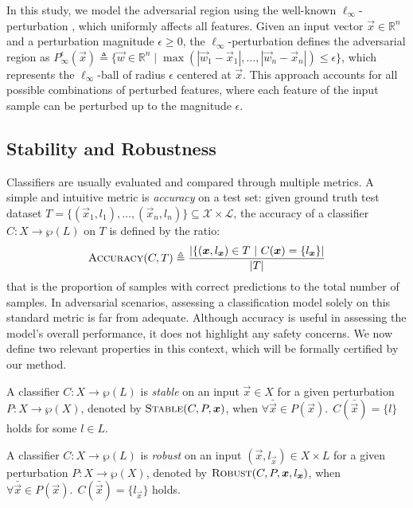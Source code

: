 In this study, we model the adversarial region using the well-known $\ell_\infty$-perturbation \cite{carlini}, which uniformly affects all features. Given an input vector $\vec{x} \in \mathbb{R}^n$ and a perturbation magnitude $\epsilon \geq 0$, the $\ell_\infty$-perturbation defines the adversarial region as $P^\epsilon_\infty(\vec{x}) \triangleq \{\vec{w} \in \mathbb{R}^n \mid \max(|\vec{w}_1 - \vec{x}_1|, \dots, |\vec{w}_n - \vec{x}_n|) \leq \epsilon \}$, which represents the $\ell_\infty$-ball of radius $\epsilon$ centered at $\vec{x}$. This approach accounts for all possible combinations of perturbed features, where each feature of the input sample can be perturbed up to the magnitude $\epsilon$.


\subsection{Stability and Robustness}
\label{subsec:stab-rob}

Classifiers are usually evaluated and compared through multiple metrics. A simple and intuitive metric is \emph{accuracy} on a test set: given ground truth test dataset $T = \{(\vec{x}_1, l_1),\dots, (\vec{x}_{n}, l_n)\} \subseteq \mathcal{X} \times \mathcal{L}$, the accuracy of a classifier $C\colon X \rightarrow \wp(L)$ on $T$  is defined by the ratio:
\begin{equation}\label{eq:accuracy}
	\textsc{Accuracy}(C, T) \triangleq \frac{|\{(\vec{x},l_{\vec{x}}) \in T ~|~ C(\vec{x}) = \{l_{\vec{x}}\}|}{|T|}
\end{equation}
that is the proportion of samples with correct predictions to the total number of samples. In adversarial scenarios, assessing a classification model solely on this standard metric is far from adequate. Although accuracy is useful in assessing the model's overall performance, it does not highlight any safety concerns. We now define two relevant properties in this context, which will be formally certified by our method.

\begin{definition}[Stability]
	\label{def:stability}
	A classifier $C\colon X \rightarrow \wp(L)$ is \emph{stable} on an input $\vec{x} \in X$ for a given perturbation $P\colon X \rightarrow \wp(X)$, denoted by $\textsc{Stable}(C, P, \vec{x})$, when $\forall \bar{\vec{x}} \in P(\vec{x}).\: ~ C(\bar{\vec{x}}) = \{l\}$ holds for some $l \in L$.
\end{definition}

\begin{definition}[Robustness]
	\label{def:robustness}
	A classifier $C\colon X \rightarrow \wp(L)$ is \emph{robust} on an input $(\vec{x}, l_{\vec{x}}) \in X \times L$ for a given perturbation $P\colon X \rightarrow \wp(X)$, denoted by $\textsc{Robust}(C, P, \vec{x}, l_{\vec{x}})$, when $\forall \bar{\vec{x}} \in P(\vec{x}).\: ~ C(\bar{\vec{x}}) = \{l_{\vec{x}}\}$ holds.
\end{definition}

